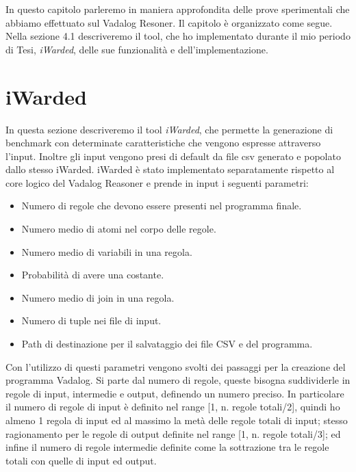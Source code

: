 In questo capitolo parleremo in maniera approfondita delle prove sperimentali che abbiamo effettuato sul Vadalog Resoner. \newline
Il capitolo è organizzato come segue. Nella sezione 4.1 descriveremo il tool, che ho implementato durante il mio periodo di Tesi, \emph{iWarded}, delle sue funzionalità e dell'implementazione. \newline

\section{iWarded}

In questa sezione descriveremo il tool \emph{iWarded}, che permette la generazione di benchmark con determinate caratteristiche che vengono espresse attraverso l'input. Inoltre gli input vengono presi di default da file csv generato e popolato dallo stesso iWarded. \newline
iWarded è stato implementato separatamente rispetto al core logico del Vadalog Reasoner e prende in input i seguenti parametri: 
\begin{itemize}
	\item Numero di regole che devono essere presenti nel programma finale.
	\item Numero medio di atomi nel corpo delle regole.
	\item Numero medio di variabili in una regola.
	\item Probabilità di avere una costante.
	\item Numero medio di join in una regola.
	\item Numero di tuple nei file di input. 
	\item Path di destinazione per il salvataggio dei file CSV e del programma.
\end{itemize}
Con l'utilizzo di questi parametri vengono svolti dei passaggi per la creazione del programma Vadalog. \newline
Si parte dal numero di regole, queste bisogna suddividerle in regole di input, intermedie e output, definendo un numero preciso. In particolare il numero di regole di input è definito nel range [1, n. regole totali/2], quindi ho almeno 1 regola di input ed al massimo la metà delle regole totali di input; stesso ragionamento per le regole di output definite nel range [1, n. regole totali/3]; ed infine il numero di regole intermedie definite come la sottrazione tra le regole totali con quelle di input ed output. \newline

